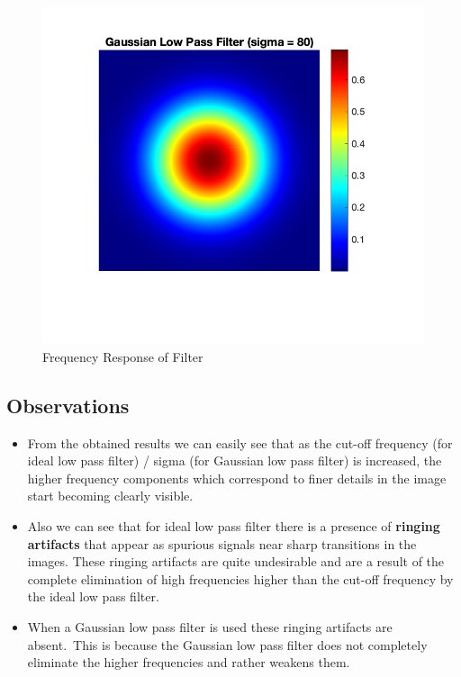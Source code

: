 \documentclass[12pt]{article}
\begin{document}
\begin{figure}[H]
    \centering
    \includegraphics{../images/gaussian_LPF_80.png}
    \caption{Frequency Response of Filter}
\end{figure}

\subsection*{Observations}

\begin{itemize}
    \item From the obtained results we can easily see that as the cut-oﬀ frequency (for ideal low pass
    ﬁlter) / sigma (for Gaussian low pass ﬁlter) is increased, the higher frequency components
    which correspond to ﬁner details in the image start becoming clearly visible.
    \item Also we can see that for ideal low pass ﬁlter there is a presence of \textbf{ringing artifacts} that appear
    as spurious signals near sharp transitions in the images. These ringing artifacts are quite
    undesirable and are a result of the complete elimination of high frequencies higher than the
    cut-oﬀ frequency by the ideal low pass ﬁlter.
    \item When a Gaussian low pass ﬁlter is used these ringing artifacts are absent.\ This is because the
    Gaussian low pass ﬁlter does not completely eliminate the higher frequencies and rather weakens
    them.
\end{itemize}
\end{document}
